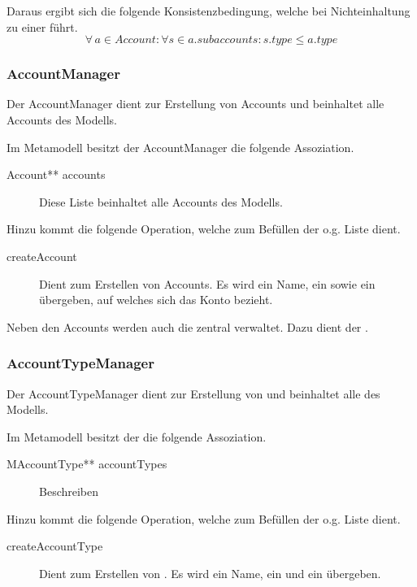 Daraus ergibt sich die folgende Konsistenzbedingung, welche bei Nichteinhaltung zu einer  führt.
\begin{equation} \forall \, a \in Account: \forall s \in a.subaccounts: s.type \leq a.type
\end{equation}




\subsubsection{AccountManager}
Der AccountManager dient zur Erstellung von Accounts und beinhaltet alle Accounts des Modells.

Im Metamodell besitzt der AccountManager die folgende Assoziation.
\begin{description}
	\item[Account** accounts] Diese Liste beinhaltet alle Accounts des Modells.
\end{description}

Hinzu kommt die folgende Operation, welche zum Befüllen der o.g. Liste dient.
\begin{description}
	\item[createAccount] Dient zum Erstellen von Accounts. Es wird ein Name, ein  sowie ein  übergeben, auf welches sich das Konto bezieht.
\end{description}

Neben den Accounts werden auch die  zentral verwaltet. Dazu dient der .


\subsubsection{AccountTypeManager}
Der AccountTypeManager dient zur Erstellung von  und beinhaltet alle  des Modells.

Im Metamodell besitzt der  die folgende Assoziation.
\begin{description}
	\item[MAccountType** accountTypes] Beschreiben
\end{description}

Hinzu kommt die folgende Operation, welche zum Befüllen der o.g. Liste dient.
\begin{description}
	\item[createAccountType] Dient zum Erstellen von . Es wird ein Name, ein  und ein  übergeben.
\end{description}
\TODO[Alex: Brauchen wir hier noch eine Konsistenzbedingung bzgl. Account-AccountType-UnitType = Account.entries-Measurement.Quantity-Type???]

